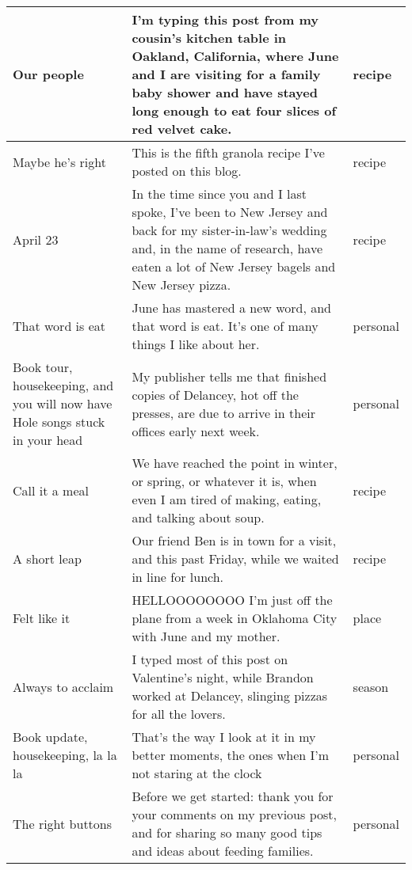 \documentclass[12pt]{article}
\begin{document}
\begin{longtable}{ | p{3.0cm} | p{12.0cm} |p{2.0cm}| }
Our people & I’m typing this post from my cousin’s kitchen table in Oakland, California, where June and I are visiting for a family baby shower and have stayed long enough to eat four slices of red velvet cake. &  recipe \\\hline

 Maybe he's right& This is the fifth granola recipe I’ve posted on this blog. &  recipe \\\hline
 
April 23 &In the time since you and I last spoke, I’ve been to New Jersey and back for my sister-in-law’s wedding and, in the name of research, have eaten a lot of New Jersey bagels and New Jersey pizza.  & recipe \\\hline

That word is eat & June has mastered a new word, and that word is eat.  It’s one of many things I like about her. & personal \\\hline

 Book tour, housekeeping, and you will now have Hole songs stuck in your head&   My publisher tells me that finished copies of Delancey, hot off the presses, are due to arrive in their offices early next week. &personal \\\hline
 
 Call it a meal& We have reached the point in winter, or spring, or whatever it is, when even I am tired of making, eating, and talking about soup. &  recipe \\\hline 
 
A short leap &  Our friend Ben is in town for a visit, and this past Friday, while we waited in line for lunch. & recipe \\\hline

Felt like it & HELLOOOOOOOO I’m just off the plane from a week in Oklahoma City with June and my mother. & place  \\\hline

 Always to acclaim& I typed most of this post on Valentine’s night, while Brandon worked at Delancey, slinging pizzas for all the lovers. &  season \\\hline
 
Book update, housekeeping, la la la & That’s the way I look at it in my better moments, the ones when I’m not staring at the clock & personal  \\\hline
The right buttons &Before we get started: thank you for your comments on my previous post, and for sharing so many good tips and ideas about feeding families.  & personal  \\\hline


\end{longtable}
\end{document}
